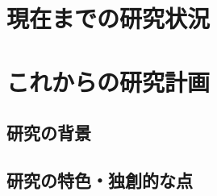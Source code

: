 \documentclass[11pt,a4paper,twoside,dvipdfmx]{jarticle}		%
\newcommand{\研究課題名}{象の卵}
\newcommand{\研究機関名}{逢坂大学}
\newcommand{\申請者氏名}{湯川秀樹}
\newcommand{\研究代表者氏名}{\申請者氏名}
\newcommand{\研究期間の最終元号年度}{34}	%
\begin{document}

\section{現在までの研究状況}
\newcommand{\現在までの研究状況}{%
	今までは、地球上で最大の生物、シロナガスクジラの卵の研究を進めようとしてきた。
	クジラの卵の場合は、高い水圧に耐える必要があるため、堅固の構造となっているはずであり、
	これが解明されれば、将来、深海潜水艇への応用も効く。
	しかし、シロナガスクジラの生息範囲が広い、海に潜っている時間が長い、
	生息数も減っている、などの原因により、
	卵を見つけることができなかった。
	
	そこで、\underline{地球で}最大の動物から、\underline{地上で}最大の動物に研究対象を変更する。

}

\section{これからの研究計画}
\subsection{研究の背景}
\newcommand{\研究の背景}{%
	象の卵の研究の背景は．．．

	\begin{thebibliography}{99}
		\bibitem{teramura} 寺村輝夫、「ぼくは王様 - ぞうのたまごのたまごやき」.
	\end{thebibliography}
}

\subsection{研究の特色・独創的な点}
\newcommand{\研究の特色と独創的な点}{%
	象の卵の特色と独創的な点は．．．
}
\end{document}
